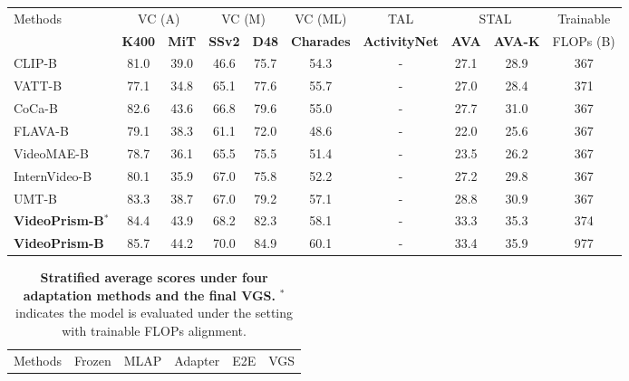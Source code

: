 \documentclass{article}
\theoremstyle{plain}
\theoremstyle{definition}
\theoremstyle{remark}
\newcommand{\OURS}{VideoPrism\xspace}
\begin{document}
\begin{table}
{}
\vskip 0.1in
\label{tbl:videoglue_e2e}
\begin{center}
\begin{scriptsize}
\begin{tabular}{@{}l|cc|cc|c|c|cc|c@{}} 
\toprule
\multirow{2}{*}{Methods} & \multicolumn{2}{c|}{VC (A)} & \multicolumn{2}{c|}{VC (M)} & VC (ML) & TAL & \multicolumn{2}{c|}{STAL} & Trainable \\
& \textbf{K400} & \textbf{MiT} & \textbf{SSv2} & \textbf{D48} & \textbf{Charades} & \textbf{ActivityNet} & \textbf{AVA} & \textbf{AVA-K} & FLOPs (B) \\
\midrule
CLIP-B~\cite{radford2021learning} & 81.0 & 39.0 & 46.6 & 75.7 & 54.3 & - & 27.1 & 28.9 & 367 \\
VATT-B~\cite{akbari2021vatt} & 77.1 & 34.8 & 65.1 & 77.6 & 55.7 & - & 27.0 & 28.4 & 371 \\
CoCa-B~\cite{yu2022coca} & 82.6 & 43.6 & 66.8 & 79.6 & 55.0 & - & 27.7 & 31.0 & 367 \\
FLAVA-B~\cite{singh2022flava} & 79.1 & 38.3 & 61.1 & 72.0 & 48.6 & - & 22.0 & 25.6 & 367 \\
VideoMAE-B~\cite{tong2022videomae} & 78.7 & 36.1 & 65.5 & 75.5 & 51.4 & - & 23.5 & 26.2 & 367 \\
InternVideo-B~\cite{wang2022internvideo} & 80.1 & 35.9 & 67.0 & 75.8 & 52.2 & - & 27.2 & 29.8 & 367 \\
UMT-B~\cite{li2023unmasked} & 83.3 & 38.7 & 67.0 & 79.2 & 57.1 & - & 28.8 & 30.9 & 367 \\
\textbf{\OURS-B}$^{\ast}$ & 84.4 & 43.9 & 68.2 & 82.3 & 58.1 & - & 33.3 & 35.3 & 374 \\
\textbf{\OURS-B} & 85.7 & 44.2 & 70.0 & 84.9 & 60.1 & - & 33.4 & 35.9 & 977 \\
\bottomrule
\end{tabular}
\end{scriptsize}
\end{center}
\vskip -0.1in
\end{table} \begin{table}
\caption{\textbf{Stratified average scores under four adaptation methods and the final VGS.} $^{\ast}$ indicates the model is evaluated under the setting with trainable FLOPs alignment.}
\vskip 0.1in
\label{tbl:videoglue_score}
\begin{center}
\begin{scriptsize}
\begin{tabular}{@{}l|c|c|c|c|c@{}} 
\toprule
Methods & Frozen & MLAP & Adapter & E2E & VGS \\

\end{tabular}
\end{scriptsize}
\end{center}
\end{table}
\end{document}
